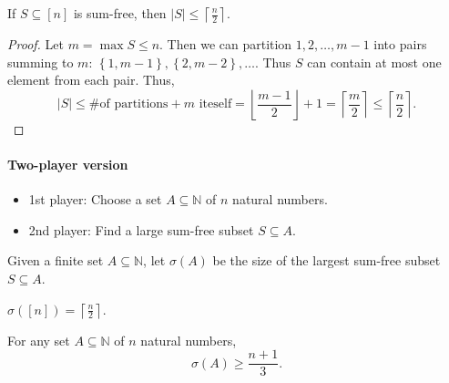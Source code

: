 \begin{proposition}
    If \(S \subseteq [n]\) is sum-free, then \(\vert S \vert \le \left\lceil \frac{n}{2} \right\rceil  \).
\end{proposition}

\begin{proof}
    Let \(m = \max S \le n\). Then we can partition \(1, 2, \dots , m - 1\) into pairs summing to \(m\): \(\left\{ 1, m - 1 \right\}, \left\{ 2, m - 2 \right\}, \dots   \). Thus \(S\) can contain at most one element from each pair. Thus,
    \[
        \vert S \vert \le \text{\# of partitions} + m \text{ iteself} =   \left\lfloor \frac{m-1}{2} \right\rfloor + 1 = \left\lceil \frac{m}{2} \right\rceil \le \left\lceil \frac{n}{2} \right\rceil .
    \]     
\end{proof}

\paragraph{Two-player version}
\begin{itemize}
    \item 1st player: Choose a set \(A \subseteq \mathbb{N} \) of \(n\) natural numbers. 
    \item 2nd player: Find a large sum-free subset \(S \subseteq A\).   
\end{itemize}

\begin{definition}
    Given a finite set \(A \subseteq \mathbb{N}\), let \(\sigma (A)\) be the size of the largest sum-free subset \(S \subseteq A\).    
\end{definition}

\begin{eg}
    \(\sigma ([n]) = \left\lceil \frac{n}{2} \right\rceil \). 
\end{eg}

\begin{theorem}[Erdos, 1965]
    For any set \(A \subseteq \mathbb{N} \) of \(n\) natural numbers, 
    \[
        \sigma (A) \ge \frac{n + 1}{3}.
    \]  
\end{theorem}

